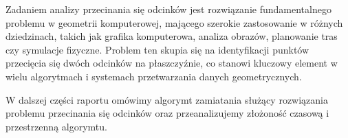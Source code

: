 \quad Zadaniem analizy przecinania się odcinków jest rozwiązanie fundamentalnego problemu w geometrii komputerowej, mającego szerokie zastosowanie w różnych dziedzinach, takich jak grafika komputerowa, analiza obrazów, planowanie tras czy symulacje fizyczne. Problem ten skupia się na identyfikacji punktów przecięcia się dwóch odcinków na płaszczyźnie, co stanowi kluczowy element w wielu algorytmach i systemach przetwarzania danych geometrycznych.

W dalszej części raportu omówimy algorymt zamiatania służący rozwiązania problemu przecinania się odcinków oraz przeanalizujemy złożoność czasową i przestrzenną algorymtu.

